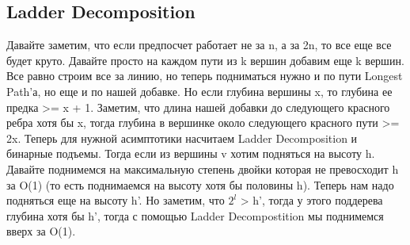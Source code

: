 \subsection{Ladder Decomposition}

Давайте заметим, что если предпосчет работает не за n, а за 2n, то все еще все будет круто. Давайте просто на каждом пути из k вершин добавим еще k вершин. Все равно строим все за линию, но теперь подниматься нужно и по пути Longest Path'а, но еще и по нашей добавке. Но если глубина вершины x, то глубина ее предка >= x + 1. Заметим, что длина нашей добавки до следующего красного ребра хотя бы x, тогда глубина в вершинке около следующего красного пути >= 2x. Теперь для нужной асимптотики насчитаем Ladder Decomposition и бинарные подъемы. Тогда если из вершины v хотим подняться на высоту h. Давайте поднимемся на максимальную степень двойки которая не превосходит h за O(1) (то есть поднимаемся на высоту хотя бы половины h). Теперь нам надо подняться еще на высоту h'. Но заметим, что $2^l$ > h', тогда у этого поддерева глубина хотя бы h', тогда с помощью Ladder Decompostition мы поднимемся вверх за O(1).